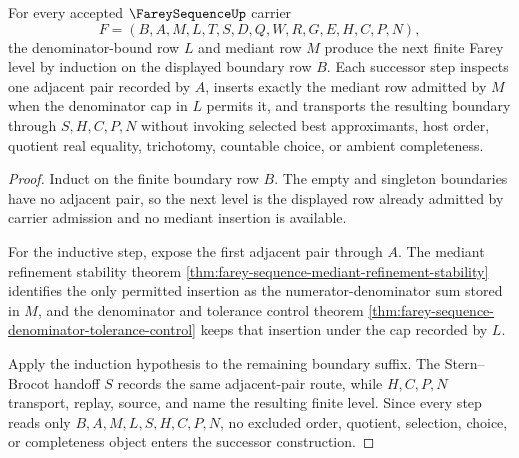 \begin{theorem}
\label{thm:farey-sequence-level-successor}
For every accepted $\FareySequenceUp$ carrier
$$
F=(B,A,M,L,T,S,D,Q,W,R,G,E,H,C,P,N),
$$
the denominator-bound row $L$ and mediant row $M$ produce the next finite Farey level by induction on the displayed boundary row $B$. Each successor step inspects one adjacent pair recorded by $A$, inserts exactly the mediant row admitted by $M$ when the denominator cap in $L$ permits it, and transports the resulting boundary through $S,H,C,P,N$ without invoking selected best approximants, host order, quotient real equality, trichotomy, countable choice, or ambient completeness.
\end{theorem}
\begin{proof}
Induct on the finite boundary row $B$. The empty and singleton boundaries have no adjacent pair, so the next level is the displayed row already admitted by carrier admission and no mediant insertion is available.

For the inductive step, expose the first adjacent pair through $A$. The mediant refinement stability theorem \autoref{thm:farey-sequence-mediant-refinement-stability} identifies the only permitted insertion as the numerator-denominator sum stored in $M$, and the denominator and tolerance control theorem \autoref{thm:farey-sequence-denominator-tolerance-control} keeps that insertion under the cap recorded by $L$.

Apply the induction hypothesis to the remaining boundary suffix. The Stern--Brocot handoff $S$ records the same adjacent-pair route, while $H,C,P,N$ transport, replay, source, and name the resulting finite level. Since every step reads only $B,A,M,L,S,H,C,P,N$, no excluded order, quotient, selection, choice, or completeness object enters the successor construction.
\end{proof}

